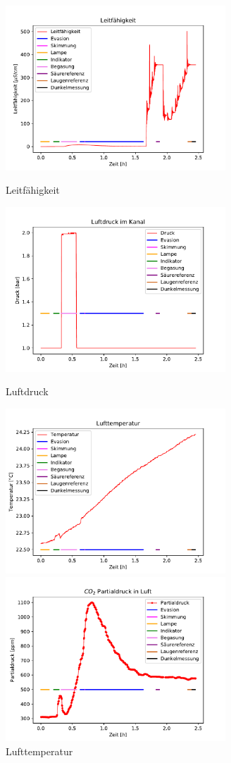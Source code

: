 \documentclass[12pt]{article}
\begin{document}
\begin{figure}[H]
	\centering
	\parbox{82.5mm}{
		\centering
		\includegraphics[width=82.5mm]{VE-Wasser/Leitfaehigkeit}
		\caption{Leitf\"ahigkeit}
	}
	\hfill%
	\parbox{82.5mm}{
		\centering
		\includegraphics[width=82.5mm]{VE-Wasser/Luftdruck}
		\caption{Luftdruck}
	}
	\centering
	\parbox{82.5mm}{
		\centering
		\includegraphics[width=82.5mm]{VE-Wasser/Lufttemperatur}
		\caption{Lufttemperatur}
	}
	\hfill%
	\parbox{82.5mm}{
		\centering
		\includegraphics[width=82.5mm]{VE-Wasser/Partialdruck}
}
\end{figure}
\end{document}
